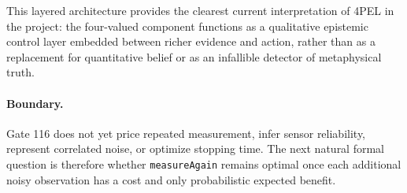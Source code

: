 This layered architecture provides the clearest current interpretation of 4PEL in the project: the four-valued component functions as a qualitative epistemic control layer embedded between richer evidence and action, rather than as a replacement for quantitative belief or as an infallible detector of metaphysical truth.

\paragraph{Boundary.}
Gate 116 does not yet price repeated measurement, infer sensor reliability, represent correlated noise, or optimize stopping time. The next natural formal question is therefore whether \texttt{measureAgain} remains optimal once each additional noisy observation has a cost and only probabilistic expected benefit.
